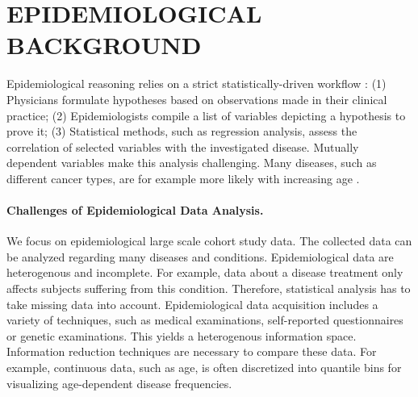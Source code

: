 \documentclass[a4paper,twoside]{style/article}
\begin{document}
\section{\uppercase{Epidemiological Background}}
\label{sec:EpidemiologicalBackground}
\noindent Epidemiological reasoning relies on a strict statistically-driven workflow \cite{Fletcher}:
(1) Physicians formulate hypotheses based on observations made in their clinical practice; (2) Epidemiologists compile a list of variables depicting a hypothesis to prove it; (3) Statistical methods, such as regression analysis, assess the correlation of selected variables with the investigated disease.
Mutually dependent variables make this analysis challenging.
Many diseases, such as different cancer types, are for example more likely with increasing age \cite{Fletcher}.
\paragraph{Challenges of Epidemiological Data Analysis.}
We focus on epidemiological large scale cohort study data.
The collected data can be analyzed regarding many diseases and conditions.
Epidemiological data are heterogenous and incomplete.
For example, data about a disease treatment only affects subjects suffering from this condition.
Therefore, statistical analysis has to take missing data into account.
Epidemiological data acquisition includes a variety of techniques, such as medical examinations, self-reported questionnaires or genetic examinations.
This yields a heterogenous information space.
Information reduction techniques are necessary to compare these data.
For example, continuous data, such as age, is often discretized into quantile bins for visualizing age-dependent disease frequencies.
\end{document}
